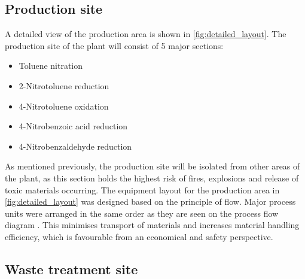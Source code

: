 \subsection{Production site}

A detailed view of the production area is shown in \cref{fig:detailed_layout}. The production site of the plant will consist of 5 major sections:

\begin{itemize}
    \item Toluene nitration
    \item 2-Nitrotoluene reduction 
    \item 4-Nitrotoluene oxidation 
    \item 4-Nitrobenzoic acid reduction 
    \item 4-Nitrobenzaldehyde reduction 
\end{itemize}

As mentioned previously, the production site will be isolated from other areas of the plant, as this section holds the highest risk of fires, explosions and release of toxic materials occurring. The equipment layout for the production area in \cref{fig:detailed_layout} was designed based on the principle of flow. Major process units were arranged in the same order as they are seen on the process flow diagram \cite{mannan_lees_2012}. This minimises transport of materials and increases material handling efficiency, which is favourable from an economical and safety perspective.  

\subsection{Waste treatment site}

